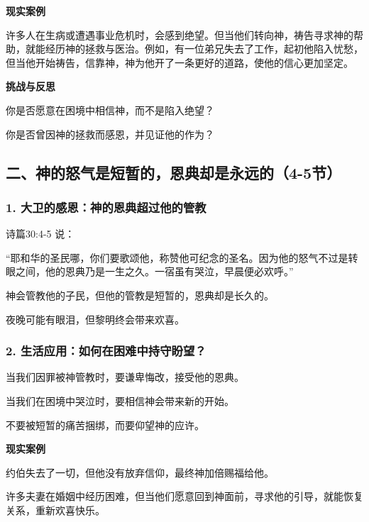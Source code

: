 \documentclass[a4paper, 12pt]{article}
\begin{document}
\textbf{现实案例}

\hspace{0.6cm}许多人在生病或遭遇事业危机时，会感到绝望。但当他们转向神，祷告寻求神的帮助，就能经历神的拯救与医治。例如，有一位弟兄失去了工作，起初他陷入忧愁，但当他开始祷告，信靠神，神为他开了一条更好的道路，使他的信心更加坚定。

\vspace{0.2cm}

\textbf{挑战与反思}

\hspace{0.6cm}你是否愿意在困境中相信神，而不是陷入绝望？

\hspace{0.6cm}你是否曾因神的拯救而感恩，并见证他的作为？
\subsection*{二、神的怒气是短暂的，恩典却是永远的（4-5节）}
\subsubsection*{1. 大卫的感恩：神的恩典超过他的管教}
\hspace{0.6cm}诗篇30:4-5 说：

“耶和华的圣民哪，你们要歌颂他，称赞他可纪念的圣名。因为他的怒气不过是转眼之间，他的恩典乃是一生之久。一宿虽有哭泣，早晨便必欢呼。”


神会管教他的子民，但他的管教是短暂的，恩典却是长久的。

夜晚可能有眼泪，但黎明终会带来欢喜。
\subsubsection*{2. 生活应用：如何在困难中持守盼望？}

\hspace{0.6cm}当我们因罪被神管教时，要谦卑悔改，接受他的恩典。

当我们在困境中哭泣时，要相信神会带来新的开始。

不要被短暂的痛苦捆绑，而要仰望神的应许。

\vspace{0.2cm}

\textbf{现实案例}

\hspace{0.6cm}约伯失去了一切，但他没有放弃信仰，最终神加倍赐福给他。

\hspace{0.6cm}许多夫妻在婚姻中经历困难，但当他们愿意回到神面前，寻求他的引导，就能恢复关系，重新欢喜快乐。
\end{document}
